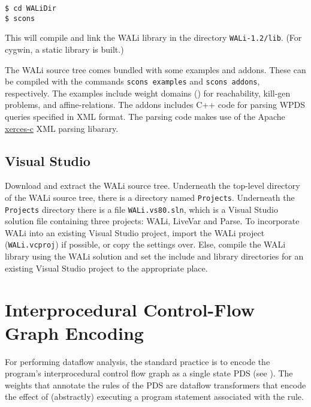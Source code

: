 \documentclass[english,a4paper,11pt]{article}
\theoremstyle{definition}
\begin{document}
\vspace{1em}
\noindent
\begin{cmdbox}
\begin{verbatim}
$ cd WALiDir
$ scons 
\end{verbatim}
\end{cmdbox}
\vspace{1em}

\noindent This will compile and link the WALi library in the directory
\verb!WALi-1.2/lib!. (For cygwin, a static library is built.) 

The WALi source tree comes bundled with some examples and addons. These can be
compiled with the commands \verb!scons examples! and \verb!scons addons!,
respectively. The examples include weight domains ()
for reachability, kill-gen problems, and affine-relations. The addons includes
C++ code for parsing WPDS queries specified in XML format. The parsing code
makes use of the Apache
\href{http://xerces.apache.org/xerces-c/}{xerces-c} XML parsing
libarary.


\subsection{Visual Studio}
\label{Se:VisualStudio}
Download and extract the WALi source tree. Underneath the top-level directory of the WALi
source tree, there is a directory named \verb!Projects!. Underneath the
\verb!Projects! directory there is a file \verb!WALi.vs80.sln!, which is a
Visual Studio solution file containing three projects: WALi, LiveVar and
Parse. To incorporate WALi into an existing Visual Studio project, import the
WALi project (\verb!WALi.vcproj!) if possible, or copy the settings over.
Else, compile the WALi library using the WALi solution and set the include and
library directories for an existing Visual Studio project to the appropriate
place.

\section{Interprocedural Control-Flow Graph Encoding}
\label{Se:icfg-encoding}
For performing dataflow analysis, the standard practice is to encode the
program's interprocedural control flow graph as a single state PDS (see
). The weights that annotate the rules of the PDS are
dataflow transformers that encode the effect of (abstractly) executing a
program statement associated with the rule.
\end{document}
